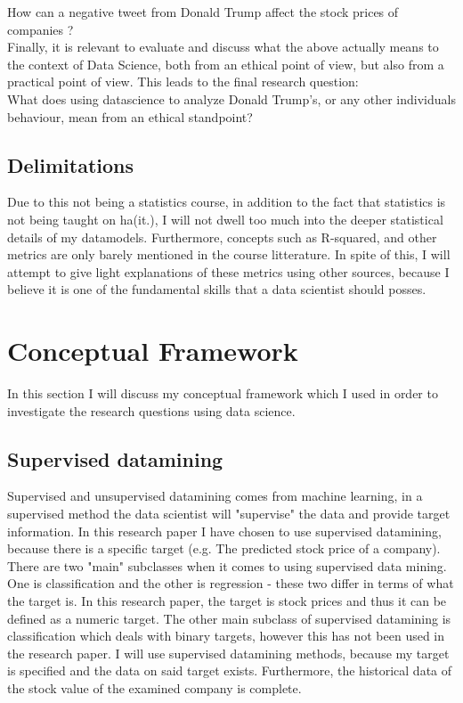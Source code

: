 \documentclass[12pt]{article}
\begin{document}
How can a negative tweet from Donald Trump affect the stock prices of companies ? \\

Finally, it is relevant to evaluate and discuss what the above actually means to the context of Data Science, both from an ethical point of view, but also from a practical point of view. This leads to the final research question: \\

What does using datascience to analyze Donald Trump's, or any other individuals behaviour, mean from an ethical standpoint?
 
\subsection{Delimitations}
Due to this not being a statistics course, in addition to the fact that statistics is not being taught on ha(it.), I will not dwell too much into the deeper statistical details of my datamodels. Furthermore, concepts such as R-squared,  and other metrics are only barely mentioned in the course litterature. In spite of this, I will attempt to give light explanations of these metrics using other sources, because I believe it is one of the fundamental skills that a data scientist should posses.

\section{Conceptual Framework}
In this section I will discuss my conceptual framework which I used in order to investigate the research questions using data science.

\subsection{Supervised datamining}
Supervised and unsupervised datamining comes from machine learning, in a supervised method the data scientist will "supervise" the data and provide target information. In this research paper I have chosen to use supervised datamining, because there is a specific target (e.g. The predicted stock price of a company).  There are two "main" subclasses when it comes to using supervised data mining. One is classification and the other is regression - these two differ in terms of what the target is. In this research paper, the target is stock prices and thus it can be defined as a numeric target. The other main subclass of supervised datamining is classification which deals with binary targets, however this has not been used in the research paper. I will use supervised datamining methods, because my target is specified and the data on said target exists. Furthermore, the historical data of the stock value of the examined company is complete.
\end{document}
